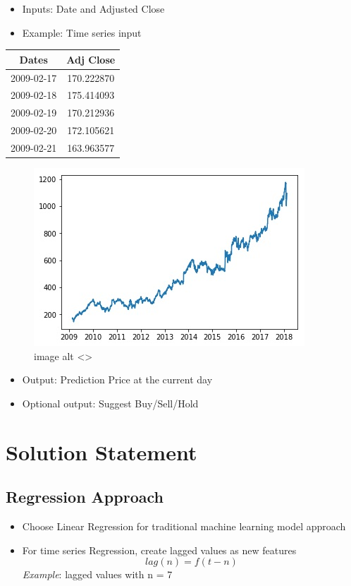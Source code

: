 \documentclass[11pt]{article}
\makeatletter
\def\maxwidth{\ifdim\Gin@nat@width>\linewidth\linewidth
    \else\Gin@nat@width\fi}
\let\Oldincludegraphics\includegraphics
\renewcommand{\includegraphics}[1]{\Oldincludegraphics[width=.8\maxwidth]{#1}}
\providecommand{\tightlist}{%
      \setlength{\itemsep}{0pt}\setlength{\parskip}{0pt}}
\makeatother
\begin{document}
\begin{itemize}
\tightlist
\item
  Inputs: Date and Adjusted Close
\item
  Example: Time series input
\end{itemize}

\begin{longtable}[]{@{}cc@{}}
\toprule
\textbf{Dates} & \textbf{Adj Close}\tabularnewline
\midrule
\endhead
2009-02-17 & 170.222870\tabularnewline
2009-02-18 & 175.414093\tabularnewline
2009-02-19 & 170.212936\tabularnewline
2009-02-20 & 172.105621\tabularnewline
2009-02-21 & 163.963577\tabularnewline
\bottomrule
\end{longtable}

\begin{figure}
\centering
\includegraphics{./figures/1.jpg}
\caption{image alt \textless{}\textgreater{}}
\end{figure}

\begin{itemize}
\tightlist
\item
  Output: Prediction Price at the current day
\item
  Optional output: Suggest Buy/Sell/Hold
\end{itemize}

\section{Solution Statement}\label{solution-statement}

\subsection{Regression Approach}\label{regression-approach}

\begin{itemize}
\tightlist
\item
  Choose Linear Regression for traditional machine learning model
  approach
\item
  For time series Regression, create lagged values as new features
  \[lag(n) = f(t-n) \] \emph{Example}: lagged values with n = 7
\end{itemize}
\end{document}
